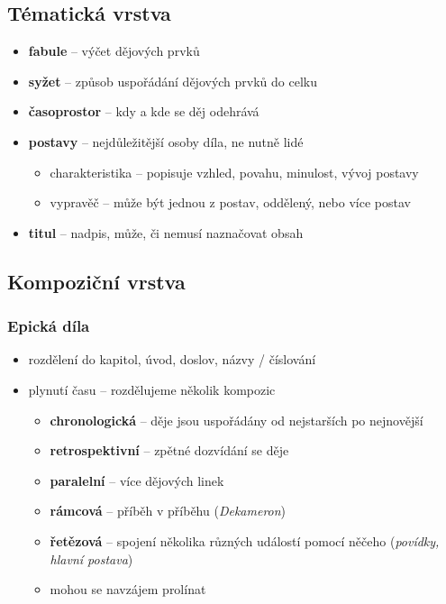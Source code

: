 \subsection{Tématická vrstva}
\begin{itemize}
\item[] \textbf{fabule} -- výčet dějových prvků
\item[] \textbf{syžet} -- způsob uspořádání dějových prvků do celku
\item[] \textbf{časoprostor} -- kdy a kde se děj odehrává
\item[] \textbf{postavy} -- nejdůležitější osoby díla, ne nutně lidé
\begin{itemize}
\item charakteristika -- popisuje vzhled, povahu, minulost, vývoj postavy
\item vypravěč -- může být jednou z postav, oddělený, nebo více postav
\end{itemize}
\item[] \textbf{titul} -- nadpis, může, či nemusí naznačovat obsah
\end{itemize}

\subsection{Kompoziční vrstva}
\subsubsection{Epická díla}
\begin{itemize}
\item rozdělení do kapitol, úvod, doslov, názvy / číslování
\item plynutí času -- rozdělujeme několik kompozic
\begin{itemize}
\item \textbf{chronologická} -- děje jsou uspořádány od nejstarších po nejnovější
\item \textbf{retrospektivní} -- zpětné dozvídání se děje
\item \textbf{paralelní} -- více dějových linek
\item \textbf{rámcová} -- příběh v příběhu (\textit{Dekameron})
\item \textbf{řetězová} -- spojení několika různých událostí pomocí něčeho (\textit{povídky, hlavní postava})
\item mohou se navzájem prolínat
\end{itemize}
\end{itemize}

